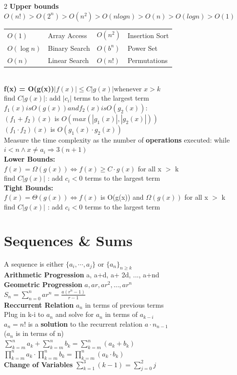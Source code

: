 \documentclass[10pt]{article}
\begin{document}
\begin{multicols*}{2}
\textbf{Upper bounds} $O(n!)> O(2^n) > O(n^2) > O(nlogn) > O(n) > O(logn) > O(1)$
\noindent
\setlength{\tabcolsep}{4pt}
\begin{tabular}{ll | ll}
    $O(1)$ &  Array Access & $O(n^2)$ &  Insertion Sort \\
    $O(\log n)$ &  Binary Search & $O(b^n)$ &  Power Set \\
    $O(n)$ &  Linear Search & $O(n!)$ &  Permutations \\
\end{tabular}\\
\textbf{f(x) = O(g(x))}$|f(x)| \leq C|g(x)|$whenever $x>k$\\
find $C|g(x)|$: add $|c_i|$ terms to the largest term\\
$f_1(x) is O(g(x)) and f_2(x) is O(g_2(x))$:\\
$(f_1+f_2)(x)$ is $O(max(|g_1(x)|,|g_2(x)|))$\\
$(f_1\cdot f_2)(x)$ is $O(g_1(x)\cdot g_2(x))$\\
Measure the time complexity as the number of \textbf{operations} executed: while $i < n \land x \neq a_i \Rightarrow 3(n+1)$\\
\textbf{Lower Bounds:}\\
$f(x) = \Omega(g(x)) \iff f(x) \geq C\cdot g(x)$ for all x $>$ k\\
find $C|g(x)|$ : add $c_i < 0$ terms to the largest term\\
\textbf{Tight Bounds:}\\
$f(x) = \Theta(g(x)) \iff f(x)$ is O(g(x)) and $\Omega(g(x))$ for all x $>$ k\\
find $C|g(x)|$ : add $c_i < 0$ terms to the largest term\\

\section{Sequences \& Sums}
A sequence is either $\{a_i, \cdots, a_j\}$ or $\{a_n\}_{n\geq k}$\\
\textbf{Arithmetic Progression} a, a+d, a+ 2d, ..., a+nd\\
\textbf{Geometric Progression} $a, ar, ar^2, ..., ar^n$\\
$S_n = \sum_{n=0}^{n}ar^n = \frac{a(r^n - 1)}{r-1}$\\
\textbf{Reccurrent Relation} $a_n$ in terms of previous terms\\
Plug in k-i to $a_n$ and solve for $a_n$ in terms of $a_{k-i}$\\
$a_n = n!$ is a \textbf{solution} to the recurrent relation $a\cdot n_{n-1}$\\
($a_n$ is in terms of n)\\
$\sum_{k=m}^{n}a_k + \sum_{k=m}^{n}b_k = \sum_{k=m}^{n}(a_k + b_k)$\\
$\prod_{k=m}^{n}a_k \cdot \prod_{k=m}^{n}b_k = \prod_{k=m}^{n}(a_k \cdot b_k)$\\
\textbf{Change of Variables} $\sum_{k=1}^{3}(k-1) = \sum_{j=0}^{2}j$\\


\end{multicols*}
\end{document}
